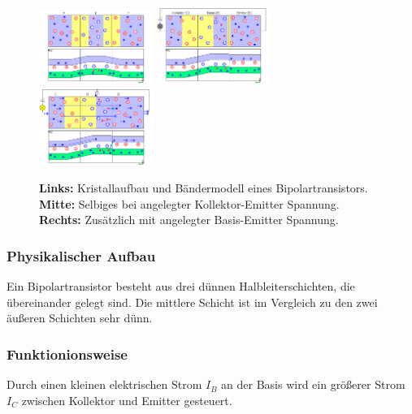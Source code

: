    \begin{figure}
        \centering
        \includegraphics[width=0.33\textwidth]{fig/npn-bipolartransistor-band1.PNG}\hfill
        \includegraphics[width=0.33\textwidth]{fig/npn-bipolartransistor-band2.PNG}\hfill
        \includegraphics[width=0.33\textwidth]{fig/npn-bipolartransistor-band3.PNG}
        \caption{\textbf{Links:} Kristallaufbau und Bändermodell eines Bipolartransistors. \textbf{Mitte:} Selbiges bei angelegter Kollektor-Emitter Spannung. \textbf{Rechts:} Zusätzlich mit angelegter Basis-Emitter Spannung.}
        \label{fig:npnTransistor}
    \end{figure}
    
    \subsubsection{Physikalischer Aufbau}
    Ein Bipolartransistor besteht aus drei dünnen Halbleiterschichten, die übereinander gelegt sind. Die mittlere Schicht ist im Vergleich zu den zwei äußeren Schichten sehr dünn.
    
    \subsubsection{Funktionionsweise}
    Durch einen kleinen elektrischen Strom $I_B$ an der Basis wird ein größerer Strom $I_C$ zwischen Kollektor und Emitter gesteuert. 
   

